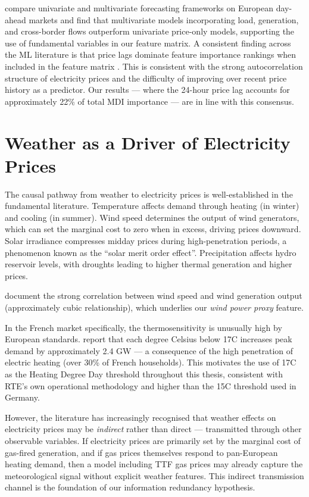 \citet{ziel2018} compare univariate and multivariate forecasting frameworks on
European day-ahead markets and find that multivariate models incorporating
load, generation, and cross-border flows outperform univariate price-only
models, supporting the use of fundamental variables in our feature matrix.
A consistent finding across the ML literature is that price lags dominate
feature importance rankings when included in the feature matrix \citep{lago2021,
uniejewski2019}. This is consistent with the strong autocorrelation structure
of electricity prices and the difficulty of improving over recent price history
as a predictor. Our results — where the 24-hour price lag accounts for
approximately 22\% of total MDI importance — are in line with this consensus.

\section{Weather as a Driver of Electricity Prices}

The causal pathway from weather to electricity prices is well-established in
the fundamental literature. Temperature affects demand through heating (in
winter) and cooling (in summer). Wind speed determines the output of wind
generators, which can set the marginal cost to zero when in excess, driving
prices downward. Solar irradiance compresses midday prices during
high-penetration periods, a phenomenon known as the ``solar merit order
effect''. Precipitation affects hydro reservoir levels, with droughts leading
to higher thermal generation and higher prices.

\citet{staffell2016} document the strong correlation between wind speed and
wind generation output (approximately cubic relationship), which underlies our
\textit{wind power proxy} feature.

In the French market specifically, the thermosensitivity is unusually high by
European standards. \citet{rte2023} report that each degree Celsius below
17\textdegree C increases peak demand by approximately 2.4 GW — a consequence
of the high penetration of electric heating (over 30\% of French households).
This motivates the use of 17\textdegree C as the Heating Degree Day threshold
throughout this thesis, consistent with RTE's own operational methodology and
higher than the 15\textdegree C threshold used in Germany.

However, the literature has increasingly recognised that weather effects on
electricity prices may be \textit{indirect} rather than direct — transmitted
through other observable variables. If electricity prices are primarily set by
the marginal cost of gas-fired generation, and if gas prices themselves respond
to pan-European heating demand, then a model including TTF gas prices may
already capture the meteorological signal without explicit weather features.
This indirect transmission channel is the foundation of our information
redundancy hypothesis.


